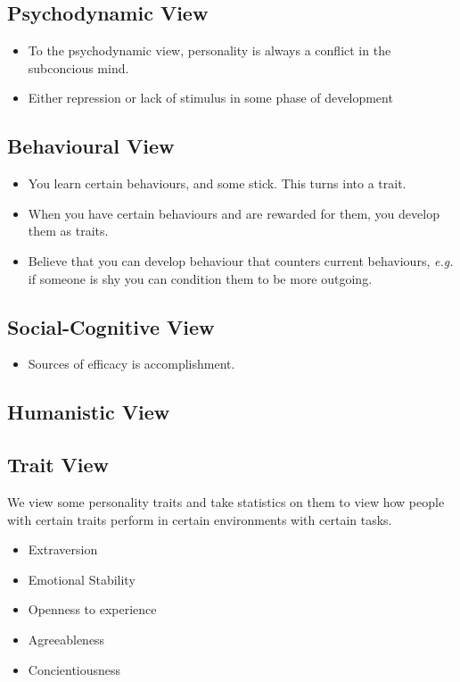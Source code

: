 \documentclass[12pt]{article}
\begin{document}
\subsection{Psychodynamic View}

\begin{itemize}
	\item To the psychodynamic view, personality is always a conflict in the
		subconcious mind.
	\item Either repression or lack of stimulus in some phase of
		development
\end{itemize}

\subsection{Behavioural View}

\begin{itemize}
	\item You learn certain behaviours, and some stick. This turns into a trait.
	\item When you have certain behaviours and are rewarded for them, you
		develop them as traits.
	\item Believe that you can develop behaviour that counters current
		behaviours, \textit{e.g.} if someone is shy you can condition them to be
		more outgoing.
\end{itemize}

\subsection{Social-Cognitive View}

\begin{itemize}
	\item Sources of efficacy is accomplishment.
\end{itemize}

\subsection{Humanistic View}

\subsection{Trait View}

We view some personality traits and take statistics on them to view how people
with certain traits perform in certain environments with certain tasks.

\begin{itemize}
	\item Extraversion
	\item Emotional Stability
	\item Openness to experience
	\item Agreeableness
	\item Concientiousness
\end{itemize}
\end{document}
